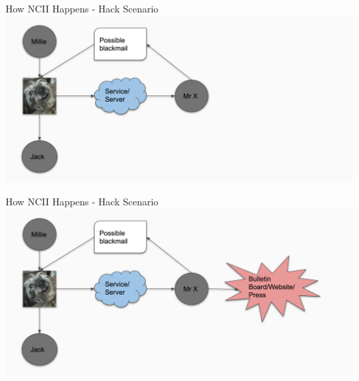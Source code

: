 \documentclass[nobackground,dvipsnames,table,aspectratio=169]{beamer}
\begin{document}
\begin{frame}{How NCII Happens - Hack Scenario}
    \includegraphics[width=\textwidth]{hack-ncii-diagram-4}
\end{frame}

\begin{frame}{How NCII Happens - Hack Scenario}
    \includegraphics[width=\textwidth]{hack-ncii-diagram-5}
\end{frame}
\end{document}

